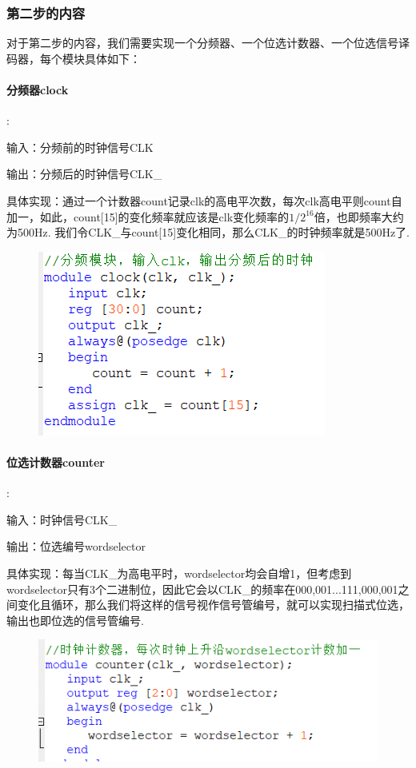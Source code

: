 \documentclass[UTF8]{ctexart}
\begin{document}
\subsubsection{第二步的内容}

对于第二步的内容，我们需要实现一个分频器、一个位选计数器、一个位选信号译码器，每个模块具体如下：\\
\paragraph{分频器clock}:\par
输入：分频前的时钟信号CLK\par
输出：分频后的时钟信号CLK\_\par
具体实现：通过一个计数器count记录clk的高电平次数，每次clk高电平则count自加一，如此，count[15]的变化频率就应该是clk变化频率的$1/2^{16}$倍，也即频率大约为500Hz. 我们令CLK\_与count[15]变化相同，那么CLK\_的时钟频率就是500Hz了.
\begin{figure}[H]\begin{center}
    \includegraphics[scale=1]{clock.PNG}
\end{center}\end{figure}
\paragraph{位选计数器counter}:\par
输入：时钟信号CLK\_\par
输出：位选编号wordselector\par


具体实现：每当CLK\_为高电平时，wordselector均会自增1，但考虑到wordselector只有3个二进制位，因此它会以CLK\_的频率在000,001...111,000,001之间变化且循环，那么我们将这样的信号视作信号管编号，就可以实现扫描式位选，输出也即位选的信号管编号.
\begin{figure}[H]\begin{center}
    \includegraphics[scale=1]{counter.PNG}
\end{center}\end{figure}
\end{document}
